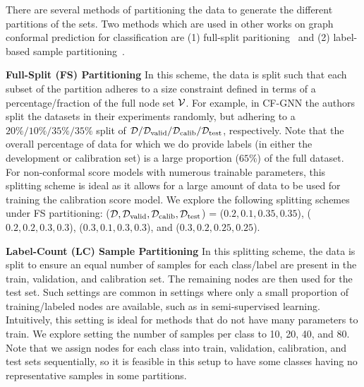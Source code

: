 There are several methods of partitioning the data to generate the different partitions of the sets. 
Two methods which are used in other works on graph conformal prediction for classification are (1) full-split paritioning~\cite{huang2024uncertainty} and (2) label-based sample partitioning~\cite{zargarbashi23conformal}.
 
\noindent \textbf{Full-Split (FS) Partitioning}
In this scheme, the data is split such that each subset of the partition adheres to a size constraint defined in terms of a percentage/fraction of the full node set ${\mathcal{V}}$.
For example, in CF-GNN \cite{huang2024uncertainty} the authors split the datasets in their experiments randomly, but adhering to a $20\%/10\%/35\%/35\%$ split of $\mathcal{D}/\mathcal{D_{\mathrm{valid}}}/\mathcal{D_{\mathrm{calib}}}/\mathcal{D_{\mathrm{test}}}$, respectively.
Note that the overall percentage of data for which we do provide labels (in either the development or calibration set) is a large proportion ($65\%$) of the full dataset.
For non-conformal score models with numerous trainable parameters, this splitting scheme is ideal as it allows for a large amount of data to be used for training the calibration score  model.
We explore the following splitting schemes under FS partitioning:
($\mathcal{D},\mathcal{D_{\mathrm{valid}}},\mathcal{D_{\mathrm{calib}}},\mathcal{D_{\mathrm{test}}}$) = ($0.2, 0.1,0.35, 0.35$), ($0.2,0.2,0.3,0.3$), ($0.3,0.1,0.3,0.3$), and ($0.3,0.2,0.25,0.25$).

\noindent \textbf{Label-Count (LC) Sample Partitioning}
In this splitting scheme, the data is split to ensure an equal number of samples for each class/label are present in the train, validation, and calibration set.
The remaining nodes are then used for the test set.
Such settings are common in settings where only a small proportion of training/labeled nodes are available, such as in semi-supervised learning.
Intuitively, this setting is ideal for methods that do not have many parameters to train.
We explore setting the number of samples per class to 10, 20, 40, and 80.
Note that we assign nodes for each class into train, validation, calibration, and test sets sequentially, so it is feasible in this setup to have some classes having no representative samples in some partitions. 
